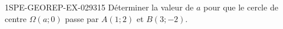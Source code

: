 \begin{exercice}{1SPE-GEOREP-EX-029}{3}{15}
Déterminer la valeur de $a$ pour que le cercle de centre $\Omega(a ; 0)$ passe par $A(1 ; 2)$ et $B(3 ; -2)$.
\end{exercice}
